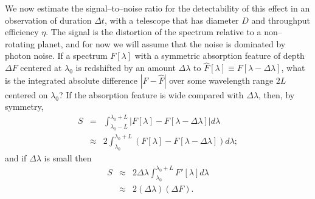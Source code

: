 \documentclass[12pt,preprint]{aastex}
\begin{document}
We now estimate the signal--to--noise ratio for the detectability of this
effect in an observation of duration $\Delta t$, with a telescope that has
diameter $D$ and throughput efficiency $\eta$.  The signal is the distortion
of the spectrum relative to a non--rotating planet, and for now we will assume
that the noise is
dominated by photon noise.  If a spectrum $F[\lambda]$ with a symmetric
absorption feature of depth $\Delta F$ centered at $\lambda_0$ is redshifted
by an amount $\Delta \lambda$ to
$\widehat{F}[\lambda] \equiv F[\lambda - \Delta \lambda]$, what is the
integrated absolute difference $|F-\widehat{F}|$ over some wavelength range
$2L$ centered on $\lambda_0$?  If the absorption feature is wide compared
with $\Delta \lambda$, then, by symmetry,
\begin{eqnarray}
\nonumber S & = & \int_{\lambda_0 - L}^{\lambda_0 + L} \left| F[\lambda] - F[\lambda - \Delta \lambda] \right| d\lambda \\
\label{eq:signal integral} & \approx & 2 \int_{\lambda_0}^{\lambda_0 + L} \left( F[\lambda] - F[\lambda - \Delta \lambda] \right) d\lambda;
\end{eqnarray}
and if $\Delta \lambda$ is small then
\begin{eqnarray}
\nonumber S & \approx & 2 \Delta \lambda \int_{\lambda_0}^{\lambda_0 + L} F'[\lambda] d\lambda \\
\label{eq:integrated diff} & \approx & 2 (\Delta \lambda) (\Delta F).
\end{eqnarray}
\end{document}
